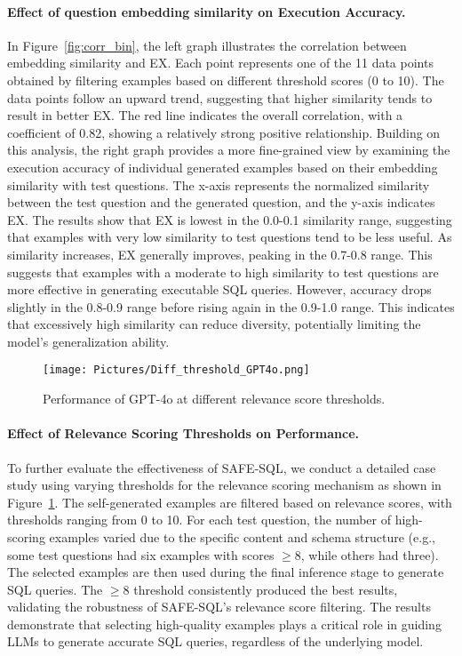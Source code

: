 \paragraph{Effect of question embedding similarity on Execution Accuracy.}
In Figure~\ref{fig:corr_bin}, the left graph illustrates the correlation between embedding similarity and EX. Each point represents one of the 11 data points obtained by filtering examples based on different threshold scores (0 to 10). The data points follow an upward trend, suggesting that higher similarity tends to result in better EX. The red line indicates the overall correlation, with a coefficient of 0.82, showing a relatively strong positive relationship. Building on this analysis, the right graph provides a more fine-grained view by examining the execution accuracy of individual generated examples based on their embedding similarity with test questions. The x-axis represents the normalized similarity between the test question and the generated question, and the y-axis indicates EX. The results show that EX is lowest in the 0.0-0.1 similarity range, suggesting that examples with very low similarity to test questions tend to be less useful. As similarity increases, EX generally improves, peaking in the 0.7-0.8 range. This suggests that examples with a moderate to high similarity to test questions are more effective in generating executable SQL queries. However, accuracy drops slightly in the 0.8-0.9 range before rising again in the 0.9-1.0 range. This indicates that excessively high similarity can reduce diversity, potentially limiting the model’s generalization ability. 


\begin{figure}[t]
\centerline{\texttt{[image: Pictures/Diff\_threshold\_GPT4o.png]}}
\caption{Performance of GPT-4o at different relevance score thresholds.}
\label{tab:diff_thres}
\end{figure}


\paragraph{Effect of Relevance Scoring Thresholds on Performance.}

To further evaluate the effectiveness of SAFE-SQL, we conduct a detailed case study using varying thresholds for the relevance scoring mechanism as shown in Figure~\ref{tab:diff_thres}.  The self-generated examples are filtered based on relevance scores, with thresholds ranging from 0 to 10. For each test question, the number of high-scoring examples varied due to the specific content and schema structure (e.g., some test questions had six examples with scores $\geq 8$, while others had three). The selected examples are then used during the final inference stage to generate SQL queries. The $\geq 8$ threshold consistently produced the best results, validating the robustness of SAFE-SQL’s relevance score filtering. The results demonstrate that selecting high-quality examples plays a critical role in guiding LLMs to generate accurate SQL queries, regardless of the underlying model.


